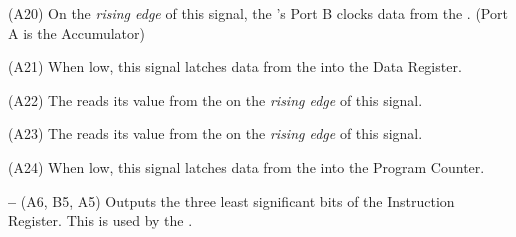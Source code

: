 \begin{description}
\item{\bfseries \WALU} (A20) On the {\em rising edge\/} of this signal, the \ALU's Port B clocks data from the \IBUS{}. (Port A is the \gls{Accumulator})
\item{\bfseries \WDR} (A21) When low, this signal latches data from the \IBUS{} into the Data Register.
\item{\bfseries \WIR} (A22) The \IR{} reads its value from the \IBUS{} on the {\em rising edge\/} of this signal.
\item{\bfseries \WMAR} (A23) The \MAR{} reads its value from the \IBUS{} on the {\em rising edge\/} of this signal.
\item{\bfseries \WPC} (A24) When low, this signal latches data from the \IBUS{} into the Program Counter.
\item{\bfseries {}–} (A6, B5, A5) Outputs the three least
  significant bits of the Instruction Register. This is used by the
  \ALU.

\end{description}
